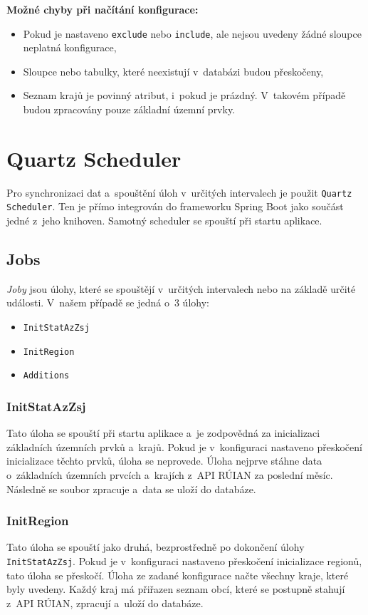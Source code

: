 \textbf{Možné chyby při načítání konfigurace:}
\begin{itemize}
    \item Pokud je nastaveno \texttt{exclude} nebo \texttt{include}, ale nejsou uvedeny žádné sloupce \textrightarrow{} neplatná konfigurace,
    \item Sloupce nebo tabulky, které neexistují v~databázi \textrightarrow{} budou přeskočeny,
    \item Seznam krajů je povinný atribut, i~pokud je prázdný. V~takovém případě budou zpracovány pouze základní územní prvky.
\end{itemize}

\newpage

\section{Quartz Scheduler}
Pro synchronizaci dat a~spouštění úloh v~určitých intervalech je použit \texttt{Quartz Scheduler}.  
Ten je přímo integrován do frameworku Spring Boot jako součást jedné z~jeho knihoven.  
Samotný scheduler se spouští při startu aplikace.

\subsection{Jobs}
\textit{Joby} jsou úlohy, které se spouštějí v~určitých intervalech nebo na základě určité události.  
V~našem případě se jedná o~3 úlohy:
\begin{itemize}
    \item \texttt{InitStatAzZsj}
    \item \texttt{InitRegion}
    \item \texttt{Additions}
\end{itemize}

\subsubsection*{InitStatAzZsj}
Tato úloha se spouští při startu aplikace a~je zodpovědná za inicializaci základních územních prvků a~krajů.  
Pokud je v~konfiguraci nastaveno přeskočení inicializace těchto prvků, úloha se neprovede.  
Úloha nejprve stáhne data o~základních územních prvcích a~krajích z~API RÚIAN za poslední měsíc.  
Následně se soubor zpracuje a~data se uloží do databáze.

\subsubsection*{InitRegion}
Tato úloha se spouští jako druhá, bezprostředně po dokončení úlohy \texttt{InitStatAzZsj}.  
Pokud je v~konfiguraci nastaveno přeskočení inicializace regionů, tato úloha se přeskočí.  
Úloha ze zadané konfigurace načte všechny kraje, které byly uvedeny.  
Každý kraj má přiřazen seznam obcí, které se postupně stahují z~API RÚIAN, zpracují a~uloží do databáze.

